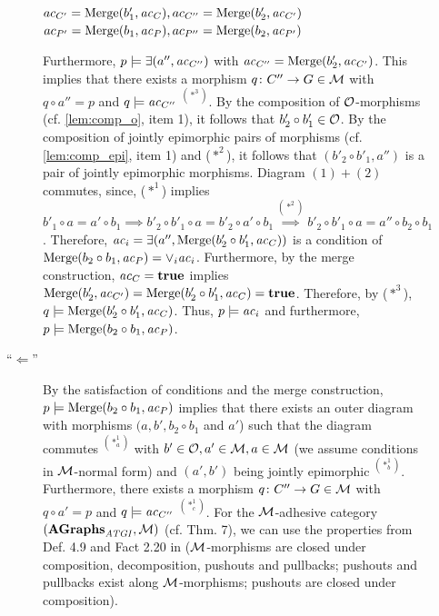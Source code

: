 \begin{description}
\begin{description}
\begin{center}
$ac_{C'}=\mathrm{Merge}(b'_1,\mathit{ac}_C),ac_{C''}=\mathrm{Merge}(b'_2,\mathit{ac}_{C'})$
$ac_{P'}=\mathrm{Merge}(b_1,\mathit{ac}_P),ac_{P''}=\mathrm{Merge}(b_2,\mathit{ac}_{P'})$
\end{center}
Furthermore, $p \models \exists(a'',\mathit{ac}_{C''})$ with $\mathit{ac}_{C''}=\mathrm{Merge}(b'_2, \mathit{ac}_{C'})$.
This implies that there exists a morphism $q\colon C'' \to G \in {\cal M}$ with $q \circ a''=p$ and $q \models \mathit{ac}_{C''}$ $^{(*^3)}$.
By the composition of ${\cal O}$-morphisms (cf. \cref{lem:comp_o}, item 1), it follows that $b'_2 \circ b'_1 \in {\cal O}$.
By the composition of jointly epimorphic pairs of morphisms (cf. \cref{lem:comp_epi}, item 1) and ($*^2$), it follows that $(b'_2 \circ b'_1,a'')$ is a pair of jointly epimorphic morphisms.
Diagram $(1)+(2)$ commutes, since, ($*^1$) implies $b'_1 \circ a=a' \circ b_1 \implies b'_2 \circ b'_1 \circ a=b'_2 \circ a' \circ b_1 \stackrel{(*^2)}{\implies} b'_2 \circ b'_1 \circ a = a'' \circ b_2 \circ b_1$.
Therefore, $\mathit{ac}_i=\exists(a'', \mathrm{Merge}(b'_2 \circ b'_1,\mathit{ac}_C))$ is a condition of $\mathrm{Merge}(b_2 \circ b_1, \mathit{ac}_P)=\vee_{i}\mathit{ac}_i$.
Furthermore, by the merge construction, $\mathit{ac}_C=\textbf{true}$ implies $\mathrm{Merge}(b'_2, \mathit{ac}_{C'}) = \mathrm{Merge}(b'_2 \circ b'_1,\mathit{ac}_C)=\textbf{true}$.
Therefore, by ($*^3$), $q \models \mathrm{Merge}(b'_2 \circ b'_1,\mathit{ac}_C)$.
Thus, $p \models \mathit{ac}_i$ and furthermore, $p \models \mathrm{Merge}(b_2 \circ b_1,\mathit{ac}_P)$.

\item[``$\Leftarrow$'']
By the satisfaction of conditions and the merge construction, $p \models \mathrm{Merge}(b_2 \circ b_1,\mathit{ac}_P)$ implies that there exists an outer diagram with morphisms $(a,b',b_2 \circ b_1$ and $a'$) such that the diagram commutes $^{(*^1_a)}$ with $b' \in {\cal O}, a' \in {\cal M},a \in {\cal M}$ (we assume conditions in ${\cal M}$-normal form) and $(a', b')$ being jointly epimorphic $^{(*^1_b)}$.
Furthermore, there exists a morphism $q\colon C'' \to G \in {\cal M}$ with $q \circ a'=p$ and $q \models \mathit{ac}_{C''}$ $^{(*^1_c)}$.
For the ${\cal M}$-adhesive category $(\mathbf{AGraphs}_\mathit{ATGI},{\cal M})$ (cf. \cite{DBLP:journals/tcs/GolasLEO12} Thm. 7), we can use the properties from Def. 4.9 and Fact 2.20 in \cite{Ehrig:2006:FAG:1121741} (${\cal M}$-morphisms are closed under composition, decomposition, pushouts and pullbacks; pushouts and pullbacks exist along ${\cal M}$-morphisms; pushouts are closed under composition).


\end{description}
\end{description}
